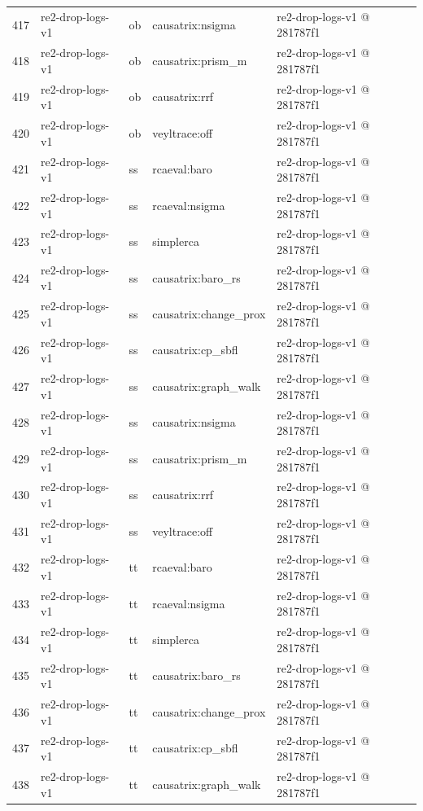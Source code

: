 \begin{longtable}{@{}r>{\raggedright\arraybackslash}p{87.0pt}>{\raggedright\arraybackslash}p{18.0pt}>{\raggedright\arraybackslash}p{63.0pt}>{\raggedright\arraybackslash}p{108.0pt}@{}}
417 & re2-drop-logs-v1 & ob & causatrix:nsigma & re2-drop-logs-v1 @ 281787f1 \\
418 & re2-drop-logs-v1 & ob & causatrix:prism\_m & re2-drop-logs-v1 @ 281787f1 \\
419 & re2-drop-logs-v1 & ob & causatrix:rrf & re2-drop-logs-v1 @ 281787f1 \\
420 & re2-drop-logs-v1 & ob & veyltrace:off & re2-drop-logs-v1 @ 281787f1 \\
421 & re2-drop-logs-v1 & ss & rcaeval:baro & re2-drop-logs-v1 @ 281787f1 \\
422 & re2-drop-logs-v1 & ss & rcaeval:nsigma & re2-drop-logs-v1 @ 281787f1 \\
423 & re2-drop-logs-v1 & ss & simplerca & re2-drop-logs-v1 @ 281787f1 \\
424 & re2-drop-logs-v1 & ss & causatrix:baro\_rs & re2-drop-logs-v1 @ 281787f1 \\
425 & re2-drop-logs-v1 & ss & causatrix:change\_prox & re2-drop-logs-v1 @ 281787f1 \\
426 & re2-drop-logs-v1 & ss & causatrix:cp\_sbfl & re2-drop-logs-v1 @ 281787f1 \\
427 & re2-drop-logs-v1 & ss & causatrix:graph\_walk & re2-drop-logs-v1 @ 281787f1 \\
428 & re2-drop-logs-v1 & ss & causatrix:nsigma & re2-drop-logs-v1 @ 281787f1 \\
429 & re2-drop-logs-v1 & ss & causatrix:prism\_m & re2-drop-logs-v1 @ 281787f1 \\
430 & re2-drop-logs-v1 & ss & causatrix:rrf & re2-drop-logs-v1 @ 281787f1 \\
431 & re2-drop-logs-v1 & ss & veyltrace:off & re2-drop-logs-v1 @ 281787f1 \\
432 & re2-drop-logs-v1 & tt & rcaeval:baro & re2-drop-logs-v1 @ 281787f1 \\
433 & re2-drop-logs-v1 & tt & rcaeval:nsigma & re2-drop-logs-v1 @ 281787f1 \\
434 & re2-drop-logs-v1 & tt & simplerca & re2-drop-logs-v1 @ 281787f1 \\
435 & re2-drop-logs-v1 & tt & causatrix:baro\_rs & re2-drop-logs-v1 @ 281787f1 \\
436 & re2-drop-logs-v1 & tt & causatrix:change\_prox & re2-drop-logs-v1 @ 281787f1 \\
437 & re2-drop-logs-v1 & tt & causatrix:cp\_sbfl & re2-drop-logs-v1 @ 281787f1 \\
438 & re2-drop-logs-v1 & tt & causatrix:graph\_walk & re2-drop-logs-v1 @ 281787f1 \\

\end{longtable}
